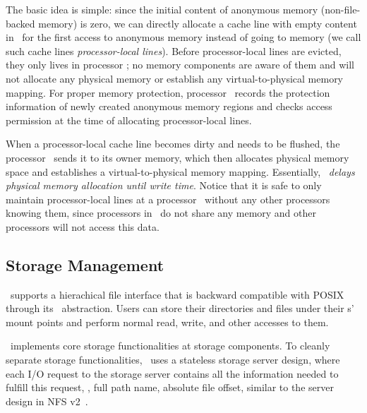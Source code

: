 \documentclass[10pt,times,twocolumn]{z2-article}
\begin{document}
{{{{{{{The basic idea is simple: since the initial content of anonymous memory 
(non-file-backed memory) is zero, %
we can directly allocate a cache line with empty content
in \excache\ for the first access to 
anonymous memory instead of going to memory
(we call such cache lines {\em processor-local lines}).
Before processor-local lines are evicted, they only lives in processor \excache;
no memory components are aware of them
and will not allocate any physical memory or establish any virtual-to-physical
memory mapping.
For proper memory protection, 
processor \microos\ records the protection information of newly created anonymous memory regions
and checks access permission at the time of allocating processor-local lines.

When a processor-local cache line becomes dirty and needs to be flushed, 
the processor \microos\ sends it to its owner memory, which then
allocates physical memory space and establishes a virtual-to-physical memory mapping.
Essentially, \lego\ {\em delays physical memory allocation until write time}.
Notice that it is safe to only maintain processor-local lines at a processor \excache\ 
without any other processors knowing them, 
since processors in \lego\ do not share any memory
and other processors will not access this data.



\subsection{Storage Management}
\lego\ supports a hierachical file interface that is backward compatible with POSIX 
through its \vnode\ abstraction. 
Users can store their directories and files under their \vnode{}s' mount points
and perform normal read, write, and other accesses to them.

\lego\ implements core storage functionalities at storage components.
To cleanly separate storage functionalities, \lego\ uses a stateless storage server design, 
where each I/O request to the storage server contains all the information needed to 
fulfill this request, \eg, full path name, absolute file offset,
similar to the server design in NFS v2~\cite{Sandberg-NFS-85}.

}}}}}}}
\end{document}
